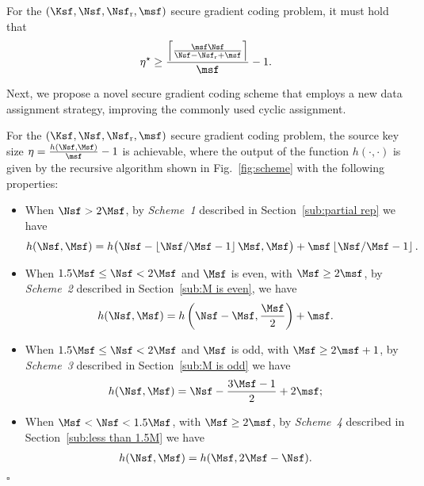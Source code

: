 \documentclass[conference,letterpaper]{IEEEtran}
\begin{document}
\begin{cor}
\label{cor:converse cor}
For the $(\Ksf,\Nsf,\Nsf_{\rm r}, \msf)$ secure gradient coding problem,
 it must hold that
\begin{align}
\eta^{\star} \geq \frac{\left\lceil  \frac{\msf\Nsf}{\Nsf-\Nsf_{\rm r}+\msf} \right\rceil}{\msf} -1. \label{eq:converse cor}
\end{align}
\end{cor} 
      


Next, we propose a novel secure gradient coding scheme that employs a new data assignment strategy, improving the commonly used cyclic  assignment.

\begin{thm}
\label{thm:main achievable scheme}
For the $(\Ksf,\Nsf,\Nsf_{\rm r}, \msf)$ secure gradient coding problem, the source key size  $\eta=  \frac{ h(\Nsf,\Msf)}{\msf}-1$ is achievable, where the output of the function \( h(\cdot, \cdot) \) is given by the recursive algorithm shown in Fig.~\ref{fig:scheme} with the following properties:
 \begin{itemize}

 \item When  $\Nsf > 2\Msf$,  by {\it Scheme~1} described in Section~\ref{sub:partial rep} we have  
\begin{align}
h(\Nsf,\Msf)=h\big(\Nsf-\left\lfloor \Nsf/\Msf-1\right\rfloor \Msf,\Msf\big)+ \msf\left\lfloor \Nsf/\Msf -1\right\rfloor  . \label{eq:from partial rep}
\end{align} 
\item When $1.5 \Msf \leq \Nsf < 2 \Msf$ and $\Msf$ is even, with $\Msf \geq 2\msf$,
by {\it Scheme~2} described in Section~\ref{sub:M is even}, we have  
\begin{align}
 h(\Nsf, \Msf) = h\left(\Nsf - \Msf, \frac{\Msf}{2}\right) + \msf. \label{eq:M is even}
\end{align}

 \item When $1.5 \Msf \leq  \Nsf < 2 \Msf$ and $\Msf$ is odd, with $\Msf \geq 2\msf+1$, by  {\it Scheme~3} described in Section~\ref{sub:M is odd} we have  
 \begin{align}
 h(\Nsf,\Msf)=   \Nsf-\frac{3\Msf-1}{2}+2 \msf; \label{eq:M is odd}
 \end{align}
 \item When $\Msf< \Nsf <  1.5 \Msf$, with $\Msf \geq 2\msf$, by  {\it Scheme~4} described in Section~\ref{sub:less than 1.5M}  we have  
\begin{align}
h(\Nsf,\Msf)=h(\Msf,2\Msf-\Nsf). \label{eq:less than 1.5M}
\end{align} 
  \end{itemize}
    \hfill $\square$ 
 \end{thm} 
\end{document}
